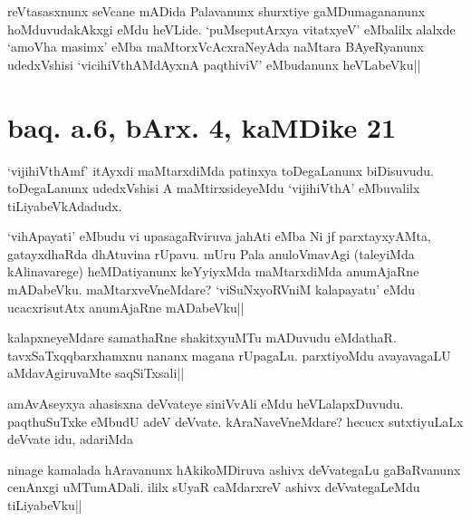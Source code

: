 \begin{artha}
reVtasasxnunx seVcane mADida Palavanunx shurxtiye gaMDumagananunx 
hoMduvudakAkxgi eMdu heVLide. `puMseputArxya vitatxyeV' eMbalilx 
alalxde `amoV\s ha masimx' eMba maMtorxVcAcxraNeyAda naMtara 
BAyeRyanunx udedxVshisi `vicihiVthAMdAyxnA paqthiviV' eMbudanunx 
heVLabeVku||
\end{artha}

\section*{baq. a.6, bArx. 4, kaMDike 21}

\stext


\begin{artha}
`vijihiVthAmf' itAyxdi maMtarxdiMda patinxya toDegaLanunx biDisuvudu. 
toDegaLanunx udedxVshisi A maMtirxsideyeMdu `vijihiVthA' eMbuvalilx 
tiLiyabeVkAdadudx.
\end{artha}


\begin{artha}
`vihApayati' eMbudu vi upasagaRviruva ja{hA}ti eMba Ni jf parxtayxyAMta, 
gatayxdhaRda dhAtuvina rUpavu. mUru Pala anuloVmavAgi (taleyiMda 
kAlinavarege) heMDatiyanunx keYyiyxMda maMtarxdiMda anumAjaRne 
mADabeVku. maMtarxveVneMdare? `viSuNxyoRVniM kalapayatu' eMdu 
ucacxrisutAtx anumAjaRne mADabeVku||
\end{artha}


\begin{artha}
kalapxneyeMdare samathaRne shakitxyuMTu mADuvudu eMdathaR. 
tavxSaTxqqbarxhamxnu nananx magana rUpagaLu. parxtiyoMdu avayavagaLU 
aMdavAgiruvaMte saqSiTxsali||
\end{artha}


\begin{artha}
amAvAseyxya ahasisxna deVvateye siniVvAli eMdu heVLalapxDuvudu. 
paqthuSuTxke eMbudU adeV deVvate. kAraNaveVneMdare? hecucx 
sutxtiyuLaLx deVvate idu, adariMda
\end{artha}

\begin{artha}
ninage kamalada hAravanunx hAkikoMDiruva ashivx deVvategaLu 
gaBaRvanunx cenAnxgi uMTumADali. ililx sUyaR caMdarxreV ashivx 
deVvategaLeMdu tiLiyabeVku|| 
\end{artha}

